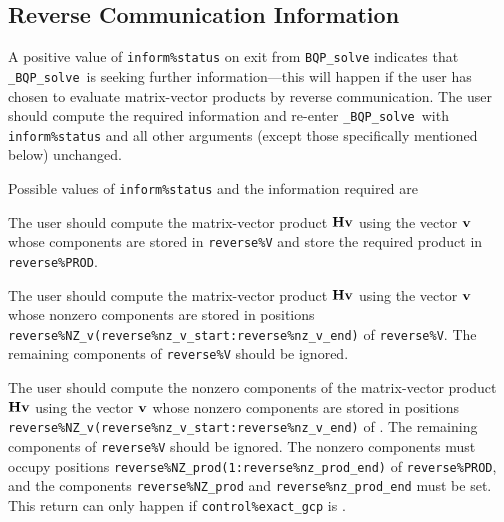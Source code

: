 \documentclass{galahad}
\newcommand{\packagename}{BQP}
\newcommand{\fullpackagename}{\libraryname\_\packagename}
\newcommand{\solver}{{\tt \fullpackagename\_solve}}
\begin{document}

\subsection{\label{reverse}Reverse Communication Information}

A positive value of {\tt inform\%status} on exit from 
{\tt \packagename\_solve}
indicates that
\solver\ is seeking further information---this will happen 
if the user has chosen to evaluate matrix-vector products by
reverse communication.
The user should compute the required information and re-enter \solver\
with {\tt inform\%status} and all other arguments (except those specifically
mentioned below) unchanged.

Possible values of {\tt inform\%status} and the information required are
\begin{description}
 The user should compute the matrix-vector product ${\mathbf{H}} {\mathbf{v}}$ 
     using the vector ${\mathbf{v}}$ whose components are stored in {\tt reverse\%V}
     and store the required product in {\tt reverse\%PROD}.

 The user should compute the matrix-vector product ${\mathbf{H}} {\mathbf{v}}$ 
     using the vector ${\mathbf{v}}$ whose nonzero components are stored in 
     positions  
     {\tt reverse\%NZ\_v(reverse\%nz\_v\_start:reverse\%nz\_v\_end)} 
     of {\tt reverse\%V}. The remaining components of {\tt reverse\%V}
     should be ignored.

 The user should compute the nonzero components of the 
     matrix-vector product ${\mathbf{H}} {\mathbf{v}}$ 
     using the vector ${\mathbf{v}}$ whose nonzero components are stored in 
     positions  
     {\tt reverse\%NZ\_v(reverse\%nz\_v\_start:reverse\%nz\_v\_end)} 
     of \linebreak {\tt reverse\%V}. The remaining components of 
     {\tt reverse\%V}
     should be ignored. The nonzero components must occupy positions
     {\tt reverse\%NZ\_prod(1:reverse\%nz\_prod\_end)} of {\tt reverse\%PROD},
     and the components \linebreak
     {\tt reverse\%NZ\_prod} and {\tt reverse\%nz\_prod\_end} must be set.
     This return can only happen if {\tt control\%exact\_gcp} is \true.

\end{description}



\end{document}
